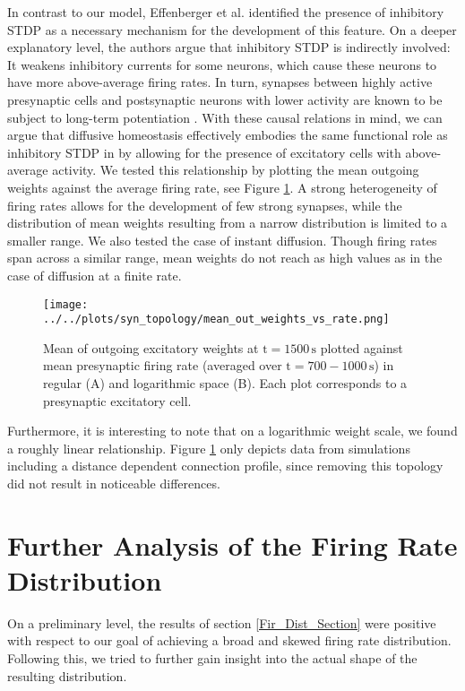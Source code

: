 \documentclass[10pt,a4paper]{article}
\begin{document}
In contrast to our model, Effenberger et al. identified the presence of inhibitory STDP as a necessary mechanism for the development of this feature. On a deeper explanatory level, the authors argue that inhibitory STDP is indirectly involved: It weakens inhibitory currents for some neurons, which cause these neurons to have more above-average firing rates. In turn, synapses between highly active presynaptic cells and postsynaptic neurons with lower activity are known to be subject to long-term potentiation \cite{Sjoestroem_Syn_Plasticity_2001,Feldman_STDP_2012}. With these causal relations in mind, we can argue that diffusive homeostasis effectively embodies the same functional role as inhibitory STDP in \cite{Effenberger_2015} by allowing for the presence of excitatory cells with above-average activity. We tested this relationship by plotting the mean outgoing weights against the average firing rate, see Figure \ref{Out_Weight_vs_F}. A strong heterogeneity of firing rates allows for the development of few strong synapses, while the distribution of mean weights resulting from a narrow distribution is limited to a smaller range. We also tested the case of instant diffusion. Though firing rates span across a similar range, mean weights do not reach as high values as in the case of diffusion at a finite rate.
\begin{figure}
\texttt{[image: ../../plots/syn\_topology/mean\_out\_weights\_vs\_rate.png]}
\caption{Mean of outgoing excitatory weights at $\mathrm{t=1500\,s}$ plotted against mean presynaptic firing rate (averaged over $\mathrm{t=700-1000\,s}$) in regular (A) and logarithmic space (B). Each plot corresponds to a presynaptic excitatory cell.}
\label{Out_Weight_vs_F}
\end{figure}
Furthermore, it is interesting to note that on a logarithmic weight scale, we found a roughly linear relationship. Figure \ref{Out_Weight_vs_F} only depicts data from simulations including a distance dependent connection profile, since removing this topology did not result in noticeable differences.
\newpage
\section{Further Analysis of the Firing Rate Distribution}
On a preliminary level, the results of section \ref{Fir_Dist_Section} were positive with respect to our goal of achieving a broad and skewed firing rate distribution. Following this, we tried to further gain insight into the actual shape of the resulting distribution. 
\end{document}
